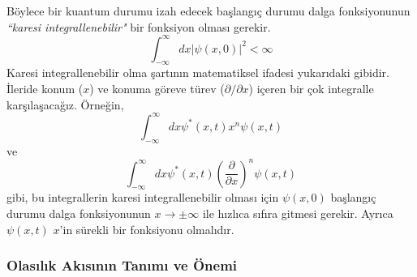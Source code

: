 \documentclass[a4paper,12pt, twoside]{article}
\begin{document}
Böylece bir kuantum durumu izah edecek başlangıç durumu dalga fonksiyonunun \emph{``karesi integrallenebilir"} bir fonksiyon olması gerekir. 
\begin{equation}
\int ^{\infty }_{-\infty }dx\left| \psi \left( x,0\right) \right| ^{2} < \infty
\label{eq:square_integrable}
\end{equation}
Karesi integrallenebilir olma şartının matematiksel ifadesi yukarıdaki gibidir. İleride konum ($x$) ve konuma göreve türev ($\partial/\partial x$) içeren bir çok integralle karşılaşacağız. Örneğin,
\begin{equation*}
\int ^{\infty }_{-\infty }dx \psi^* \left( x,t\right) x^n \psi \left( x,t\right) 
\end{equation*}
ve
\begin{equation*}
\int ^{\infty }_{-\infty }dx \psi^* \left( x,t\right) \left(\frac{\partial}{\partial x}\right)^n \psi \left( x,t\right) 
\end{equation*}
gibi, bu integrallerin karesi integrallenebilir olması için $\psi(x,0)$ başlangıç durumu dalga fonksiyonunun $x\rightarrow\pm\infty$ ile hızlıca sıfıra gitmesi gerekir. Ayrıca $\psi(x,t)$ $x$'in sürekli bir fonksiyonu olmalıdır.

\subsubsection{Olasılık Akısının Tanımı ve Önemi}

\end{document}
